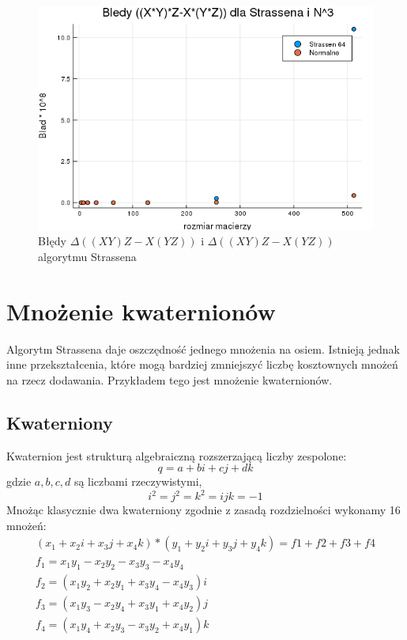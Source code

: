 \documentclass[paper=a4, fontsize=11pt]{scrartcl} %
\numberwithin{equation}{section} %
\numberwithin{figure}{section} %
\numberwithin{table}{section} %
\begin{document}
\begin{figure}[h!]
  \includegraphics[width=\linewidth]{BladXYZ.png}
  \caption{Błędy $\Delta((X Y)Z - X(Y Z))$ i $\Delta((X Y)Z - X(Y Z))$ algorytmu Strassena}
  \label{xyz}
\end{figure}


\FloatBarrier

\section{Mnożenie kwaternionów}
Algorytm Strassena daje oszczędność jednego mnożenia na osiem. Istnieją jednak inne przekształcenia,
które mogą bardziej zmniejszyć liczbę kosztownych mnożeń na rzecz dodawania. Przykładem tego jest mnożenie kwaternionów.

\subsection{Kwaterniony}
Kwaternion jest strukturą algebraiczną rozszerzającą liczby zespolone:
\[q = a + bi + cj + dk \]
gdzie ${a,b,c,d}$ są liczbami rzeczywistymi,
 \[i^{2}=j^{2}=k^{2}=ijk=-1 \]
Mnożąc klasycznie dwa kwaterniony zgodnie z zasadą rozdzielności wykonamy 16 mnożeń:\medbreak
\begin{equation}
	\begin{gathered}
	(x_1 + x_2 i + x_3 j + x_4 k ) * (y_1 + y_2 i + y_3 j + y_4 k) = f1 + f2 + f3 + f4 \\
	f_1 = x_1 y_1 - x_2 y_2 - x_3 y_3 - x_4 y_4 \\
	f_2 = (x_1 y_2 + x_2 y_1 + x_3 y_4 - x_4 y_3 ) i \\
	f_3 = ( x_1 y_3 - x_2 y_4 + x_3 y_1 + x_4 y_2 ) j \\
	f_4 = ( x_1 y_4 + x_2 y_3 - x_3 y_2 + x_4 y_1 ) k	
	\end{gathered}
\end{equation}
\end{document}
